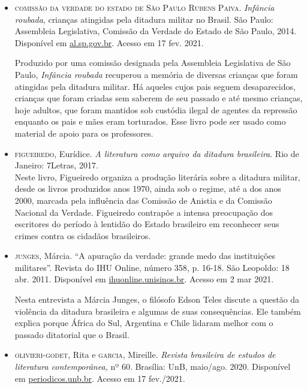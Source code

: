 \documentclass[12pt]{extarticle}
\begin{document}
\begin{itemize}

\item \textsc{comissão da verdade do estado de São Paulo Rubens Paiva.} \emph{Infância
roubada}, crianças atingidas pela ditadura militar no Brasil. São Paulo:
Assembleia Legislativa, Comissão da Verdade do Estado de São Paulo,
2014. Disponível em
\href{https://www.al.sp.gov.br/repositorio/bibliotecaDigital/20800_arquivo.pdf}{{al.sp.gov.br}}.
Acesso em 17 fev. 2021.

Produzido por uma comissão designada pela Assembleia Legislativa de São
Paulo, \emph{Infância roubada} recuperou a memória de diversas crianças
que foram atingidas pela ditadura militar. Há aqueles cujos pais seguem
desaparecidos, crianças que foram criadas sem saberem de seu passado e
até mesmo crianças, hoje adultos, que foram mantidos sob custódia ilegal
de agentes da repressão enquanto os pais e mães eram torturados. Esse
livro pode ser usado como material de apoio para os professores.

\item \textsc{figueiredo}, Eurídice. \emph{A literatura como arquivo da ditadura
brasileira}. Rio de Janeiro: 7Letras, 2017.\\

Neste livro, Figueiredo organiza a produção literária sobre a ditadura
militar, desde os livros produzidos anos 1970, ainda sob o regime, até a
dos anos 2000, marcada pela influência das Comissão de Anistia e da
Comissão Nacional da Verdade. Figueiredo contrapõe a intensa preocupação
dos escritores do período à lentidão do Estado brasileiro em reconhecer
seus crimes contra os cidadãos brasileiros.

\item \textsc{junges}, Márcia. ``A apuração da verdade: grande medo das instituições
militares''. Revista do IHU Online, número 358, p. 16-18. São Leopoldo:
18 abr. 2011. Disponível em
\href{http://www.ihuonline.unisinos.br/media/pdf/IHUOnlineEdicao358.pdf}{{ihuonline.unisinos.br}}.
Acesso em 2 mar 2021.

Nesta entrevista a Márcia Junges, o filósofo Edson Teles discute a
questão da violência da ditadura brasileira e algumas de suas
consequências. Ele também explica porque África do Sul, Argentina e
Chile lidaram melhor com o passado ditatorial que o Brasil.

\item \textsc{olivieri-godet}, Rita e \textsc{garcia}, Mireille. \emph{Revista brasileira de
estudos de literatura contemporânea,} nº 60. Brasília: UnB, maio/ago.
2020. Disponível em
\href{periodicos.unb.br/index.php/estudos/issue/view/1995}{periodicos.unb.br}.
Acesso em 17 fev./2021.


\end{itemize}
\end{document}
